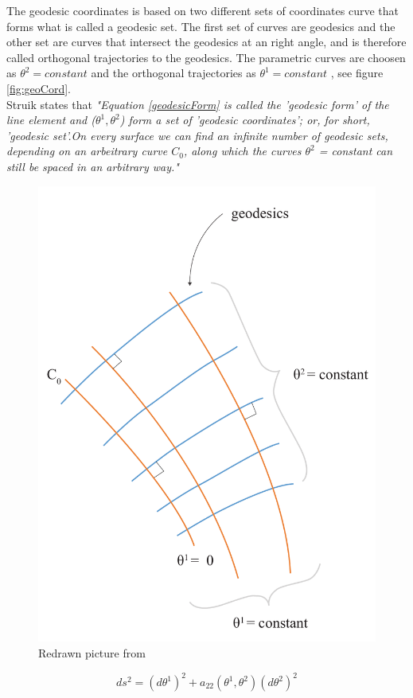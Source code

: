 The geodesic coordinates is based on two different sets of coordinates curve that forms what is called a geodesic set. The first set of curves are geodesics and the other set are curves that intersect the geodesics at an right angle, and is therefore called orthogonal trajectories to the geodesics. The parametric curves are choosen as $\theta^2 = constant$ and the orthogonal trajectories as $\theta^1 =constant$ \cite{ref:Williams}, see figure \ref{fig:geoCord}. \\

 Struik\cite{ref:Struik} states that \textit{"Equation \ref{geodesicForm} is called the 'geodesic form' of the line element and ($\theta^1,\theta^2$) form a set of 'geodesic coordinates'; or, for short, 'geodesic set'.On every surface we can find an infinite number of geodesic sets, depending on an arbeitrary curve $C_0$, along which the curves $\theta^2$ = constant can still be spaced in an arbitrary way."}\\

\begin{figure}[H]
\centering
\includegraphics[height=0.8\linewidth ]{figure/Theory/geodesicCoordRe.pdf}
\caption{Redrawn picture from \cite{ref:Struik}  }
\label{fig:geodesicCoord}
\end{figure}


\begin{equation}\label{geodesicForm}
    ds^2 = (d\theta^1)^2 + a_{22}(\theta^1,\theta^2)(d\theta^2)^2
\end{equation}

